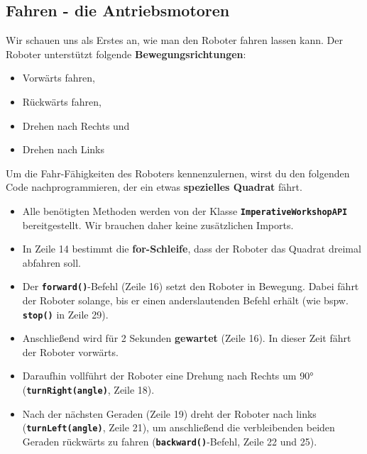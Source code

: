 \documentclass[
	12pt,
	article,
	type=bsc, %
	colorbacktitle,
	instlogo,
	accentcolor=tud1c,
	german,
	twoside
]{tudexercise}
\newcommand{\solpath}[0]{../../impl/androidApp/app/src/main/java/org/mindroid/android/app/programs/workshop/solutions}
\newcommand{\bfcode}[1]{\texttt{\textbf{#1}}}
\begin{document}
	\subsection{Fahren - die Antriebsmotoren}
	Wir schauen uns als Erstes an, wie man den Roboter fahren lassen kann. Der Roboter unterstützt folgende \textbf{Bewegungsrichtungen}:
	\begin{itemize}
	\item Vorwärts fahren,
	\item Rückwärts fahren,
	\item Drehen nach Rechts und
	\item Drehen nach Links
	\end{itemize}
	
	Um die Fahr-Fähigkeiten des Roboters kennenzulernen, wirst du den folgenden Code nachprogrammieren, der ein etwas \textbf{spezielles Quadrat} fährt.
	
	
	
	\begin{itemize}
	\setlength{\itemsep}{0pt}
	\item Alle benötigten Methoden werden von der Klasse \bfcode{ImperativeWorkshopAPI} bereitgestellt. Wir brauchen daher keine zusätzlichen Imports.
	\item In Zeile 14 bestimmt die \textbf{for-Schleife}, dass der Roboter das Quadrat dreimal abfahren soll.
	\item Der \bfcode{forward()}-Befehl (Zeile 16) setzt den Roboter in Bewegung. Dabei fährt der Roboter solange, bis er einen anderslautenden Befehl erhält (wie bspw. \bfcode{stop()} in Zeile 29).
	\item Anschließend wird für 2 Sekunden \textbf{gewartet} (Zeile 16). In dieser Zeit fährt der Roboter vorwärts.
	\item Daraufhin vollführt der Roboter eine Drehung nach Rechts um 90° (\bfcode{turnRight(angle)}, Zeile 18).
	\item Nach der nächsten Geraden (Zeile 19) dreht der Roboter nach links (\bfcode{turnLeft(angle)}, Zeile 21), um anschließend die verbleibenden beiden Geraden rückwärts zu fahren (\bfcode{backward()}-Befehl, Zeile 22 und 25).
	
	\end{itemize}
	
\end{document}
